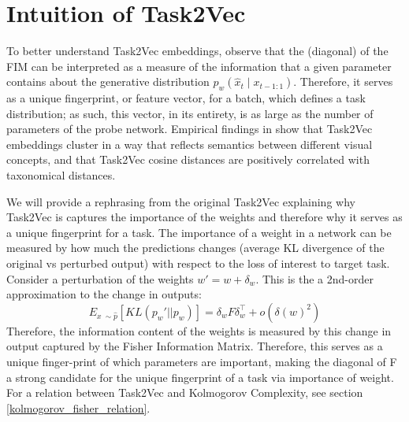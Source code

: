 \documentclass[10pt]{article} %
\begin{document}





\appendix
\section{Intuition of Task2Vec}
\label{appendix:intuitiontask2vec}
To better understand Task2Vec embeddings, observe that the (diagonal) of the FIM can be interpreted as a measure of the information that a given parameter contains about the generative distribution $p_w(\hat x_t \mid x_{t-1:1})$. 
Therefore, it serves as a unique fingerprint, or feature vector, for a batch, which defines a task distribution; as such, this vector, in its entirety, is as large as the number of parameters of the probe network.
Empirical findings in \citep{task2vec} show that Task2Vec embeddings cluster in a way that reflects semantics between different visual concepts, and that Task2Vec cosine distances are positively correlated with taxonomical distances.

We will provide a rephrasing from the original Task2Vec \cite{task2vec} explaining why Task2Vec is captures the importance of the weights and therefore why it serves as a unique fingerprint for a task.
The importance of a weight in a network can be measured by how much the predictions changes (average KL divergence of the original vs perturbed output) with respect to the loss of interest to target task.
Consider a perturbation of the weights $w' = w + \delta_w$.
This is the a 2nd-order approximation to the change in outputs:
$$
E_{x ~\sim \hat{p}}[KL(p_w' || p_w)] = \delta_w F \delta_w^\top + o(\delta(w)^2)
$$
Therefore, the information content of the weights is measured by this change in output captured by the Fisher Information Matrix.
Therefore, this serves as a unique finger-print of which parameters are important, making the diagonal of F a strong candidate for the unique fingerprint of a task via importance of weight.
For a relation between Task2Vec and Kolmogorov Complexity, see section \ref{kolmogorov_fisher_relation}.
\end{document}
